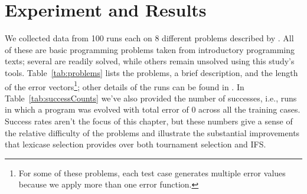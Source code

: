 \section{Experiment and Results}
\label{sec:experiment-results}

We collected data
from 100 runs each on 8 different problems described by \cite{Helmuth:2015:GECCO}. All of these are
basic programming problems taken from introductory programming texts; several are readily solved, while others
remain unsolved using this study's tools. Table~\ref{tab:problems} lists
the problems, a brief description, and the length of the error vectors\footnote{For some of these problems, each test case
	generates multiple error values because we apply more than one error function.}; other details of the runs can be
found in \citep{Helmuth:2015:GECCO}. In Table~\ref{tab:successCounts} we've also provided the number 
of successes, i.e., runs in which a program was evolved with total error of 0 across all the training cases.
Success rates aren't the focus of this chapter, but these numbers give a sense of the relative
difficulty of the problems and illustrate the substantial improvements that lexicase selection
provides over both tournament selection and IFS.

